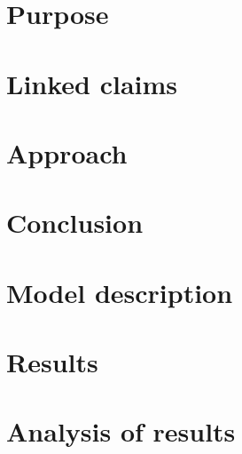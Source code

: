 \section*{Purpose}

\section*{Linked claims}

\section*{Approach}


\section*{Conclusion} 


\section*{Model description}
 

\section*{Results}



\section*{Analysis of results}



\printrefsegment
